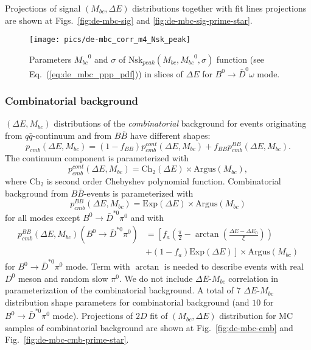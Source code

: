 \documentclass[preprint,aps,showpacs]{revtex4}
\newcommand{\bdomega}{\ensuremath{B^0\to \bar D^0\omega}\xspace}
\newcommand{\btodstpi}{\ensuremath{B^0\to \bar D^{*0}\pi^0}\xspace}
\newcommand{\de}{\ensuremath{\Delta E}\xspace}
\newcommand{\mbc}{\ensuremath{M_{bc}}\xspace}
\begin{document}
Projections of signal $(\mbc,\de)$ distributions together with fit lines projections are shown at Figs.~\ref{fig:de-mbc-sig} and \ref{fig:de-mbc-sig-prime-star}.

\begin{figure}[htb]
 \texttt{[image: pics/de-mbc\_corr\_m4\_Nsk\_peak]}
 \caption{Parameters $\mbc^0$ and $\sigma$ of $\text{Nsk}_{peak}(\mbc,\mbc^0,\sigma)$ function (see Eq.~(\ref{eq:de_mbc_ppp_pdf})) in slices of \de for \bdomega mode.}
\label{fig:de-mbc-peak-corr}
\end{figure}

\subsubsection{Combinatorial background}\label{sec:de_mbc_comb}
$(\de,\mbc)$ distributions of the {\it combinatorial} background for events originating from $q\bar q$-continuum and from $B\bar B$ have different shapes:
\begin{equation}\label{eq:de-mbc-cpmb}
 p_{cmb}(\de,\mbc) = (1-f_{BB})p^{cont}_{cmb}(\de,\mbc) + f_{BB}p_{cmb}^{BB}(\de,\mbc).
\end{equation}
The continuum component is parameterized with
\begin{equation}\label{eq:de-mbc-cont}
 p^{cont}_{cmb}(\de,\mbc) = \text{Ch}_2(\de)\times\text{Argus}(\mbc),
\end{equation}
where $\text{Ch}_2$ is second order Chebyshev polynomial function. Combinatorial background from $B\bar B$-events is parameterized with
\begin{equation}\label{eq:de-mbc-BB}
 p_{cmb}^{BB}(\de,\mbc) = \text{Exp}(\de)\times\text{Argus}(\mbc)
\end{equation}
for all modes except \btodstpi and with
\begin{equation}\label{eq:de-mbc-BB-dst0}
 \begin{split}
  p_{cmb}^{BB}(\de,\mbc)(\btodstpi) &= \left[f_{a}\left(\frac{\pi}{2}-\arctan\left(\frac{\de - \de_0}{\xi}\right)\right)\right.\\
  &\left.+(1-f_{a})\text{Exp}(\de)\right]\times\text{Argus}(\mbc)
 \end{split}
\end{equation}
for \btodstpi mode. Term with $\arctan$ is needed to describe events with real $D^0$ meson and random slow $\pi^0$. We do not include \de-\mbc correlation in parameterization of the combinatorial background. A total of $7$ \de-\mbc distribution shape parameters for combinatorial background (and $10$ for \btodstpi mode). Projections of $2D$ fit of $(\mbc,\de)$ distribution for MC samples of combinatorial background are shown at Fig.~\ref{fig:de-mbc-cmb} and Fig.~\ref{fig:de-mbc-cmb-prime-star}.
\end{document}
